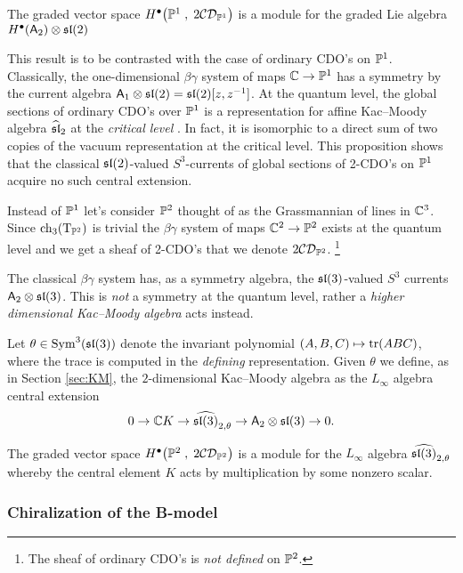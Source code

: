 \documentclass[11pt]{amsart}
\def\CDO{{\cC\cD}}
\begin{document}
\begin{prop}
The graded vector space $H^\bu \big(\PP^1 \; , \; 2 \CDO_{\PP^1}\big)$ is a module for the graded Lie algebra $H^\bu(\sfA_2) \otimes \sl(2)$
\end{prop}

\begin{rmk}
This result is to be contrasted with the case of ordinary CDO's on $\PP^1$. 
Classically, the one-dimensional $\beta\gamma$ system of maps $\CC \to \PP^1$ has a symmetry by the current algebra $\sfA_1 \otimes \sl(2) = \sl(2)[z,z^{-1}]$. 
At the quantum level, the global sections of ordinary CDO's over $\PP^1$ is a representation for affine Kac--Moody algebra $\Hat{\sl}_2$ at the {\em critical level} \cite[Theorem 5.7]{MSV}. 
In fact, it is isomorphic to a direct sum of two copies of the vacuum representation at the critical level.
This proposition shows that the classical $\sl(2)$-valued $S^3$-currents of global sections of 2-CDO's on $\PP^1$ acquire no such central extension. 
\end{rmk}

Instead of $\PP^1$ let's consider $\PP^2$ thought of as the Grassmannian of lines in $\CC^3$. 
Since $\ch_3(\T_{\PP^2})$ is trivial
the $\beta\gamma$ system of maps $\CC^2 \to \PP^2$ exists at the quantum level and we get a sheaf of 2-CDO's that we denote $2\CDO_{\PP^2}$. \footnote{The sheaf of ordinary CDO's is {\em not defined} on $\PP^2$.} 

The classical $\beta\gamma$ system has, as a symmetry algebra, the $\sl(3)$-valued $S^3$ currents $\sfA_2 \otimes \sl(3)$. 
This is {\em not} a symmetry at the quantum level, rather a {\em higher dimensional Kac--Moody algebra} acts instead.

Let $\theta \in {\rm Sym}^3(\sl(3))$ denote the invariant polynomial $(A,B,C) \mapsto {\rm tr}(ABC)$, where the trace is computed in the {\em defining} representation.
Given $\theta$ we define, as in Section \ref{sec:KM}, the $2$-dimensional Kac--Moody algebra as the $L_\infty$ algebra central extension
\[
0 \to \CC K \to \Hat{\sl(3)}_{2,\theta} \to \sfA_2 \otimes \sl(3) \to 0 .
\]

\begin{prop}
The graded vector space $H^\bu \big(\PP^2 \; , \; 2 \CDO_{\PP^2}\big)$ is a module for the $L_\infty$ algebra $\Hat{\sl(3)}_{2, \theta}$ whereby the central element $K$ acts by multiplication by some nonzero scalar. 
\end{prop}


\subsubsection{Chiralization of the B-model}
\end{document}
